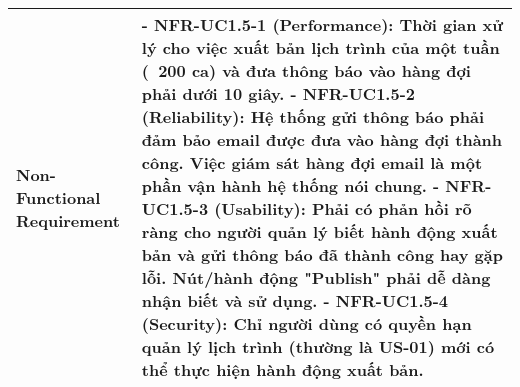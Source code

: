 \begin{longtable}{|m{4cm}|p{11cm}|}
\hline
Non-Functional Requirement & - \textbf{NFR-UC1.5-1 (Performance):} Thời gian xử lý cho việc xuất bản lịch trình của một tuần (~200 ca) và đưa thông báo vào hàng đợi phải dưới 10 giây. \newline - \textbf{NFR-UC1.5-2 (Reliability):} Hệ thống gửi thông báo phải đảm bảo email được đưa vào hàng đợi thành công. Việc giám sát hàng đợi email là một phần vận hành hệ thống nói chung. \newline - \textbf{NFR-UC1.5-3 (Usability):} Phải có phản hồi rõ ràng cho người quản lý biết hành động xuất bản và gửi thông báo đã thành công hay gặp lỗi. Nút/hành động "Publish" phải dễ dàng nhận biết và sử dụng. \newline - \textbf{NFR-UC1.5-4 (Security):} Chỉ người dùng có quyền hạn quản lý lịch trình (thường là US-01) mới có thể thực hiện hành động xuất bản. \\
\hline

\end{longtable}


